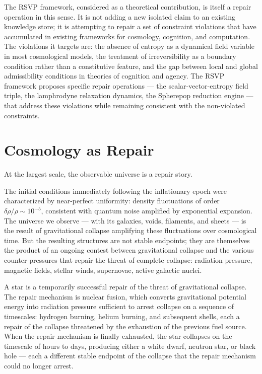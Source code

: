 \documentclass[11pt, a4paper]{article}
\theoremstyle{definition}
\theoremstyle{remark}
\begin{document}
The RSVP framework, considered as a theoretical contribution, is itself a
repair operation in this sense. It is not adding a new isolated claim to an
existing knowledge store; it is attempting to repair a set of constraint
violations that have accumulated in existing frameworks for cosmology, cognition,
and computation. The violations it targets are: the absence of entropy as a
dynamical field variable in most cosmological models, the treatment of
irreversibility as a boundary condition rather than a constitutive feature, and
the gap between local and global admissibility conditions in theories of
cognition and agency. The RSVP framework proposes specific repair operations ---
the scalar-vector-entropy field triple, the lamphrodyne relaxation dynamics,
the Spherepop reduction engine --- that address these violations while remaining
consistent with the non-violated constraints.

\section{Cosmology as Repair}

At the largest scale, the observable universe is a repair story.

The initial conditions immediately following the inflationary epoch were
characterized by near-perfect uniformity: density fluctuations of order
$\delta\rho/\rho \sim 10^{-5}$, consistent with quantum noise amplified by
exponential expansion. The universe we observe --- with its galaxies, voids,
filaments, and sheets --- is the result of gravitational collapse amplifying
these fluctuations over cosmological time. But the resulting structures are not
stable endpoints; they are themselves the product of an ongoing contest between
gravitational collapse and the various counter-pressures that repair the threat
of complete collapse: radiation pressure, magnetic fields, stellar winds,
supernovae, active galactic nuclei.

A star is a temporarily successful repair of the threat of gravitational
collapse. The repair mechanism is nuclear fusion, which converts gravitational
potential energy into radiation pressure sufficient to arrest collapse on a
sequence of timescales: hydrogen burning, helium burning, and subsequent shells,
each a repair of the collapse threatened by the exhaustion of the previous fuel
source. When the repair mechanism is finally exhausted, the star collapses on
the timescale of hours to days, producing either a white dwarf, neutron star,
or black hole --- each a different stable endpoint of the collapse that the
repair mechanism could no longer arrest.
\end{document}
